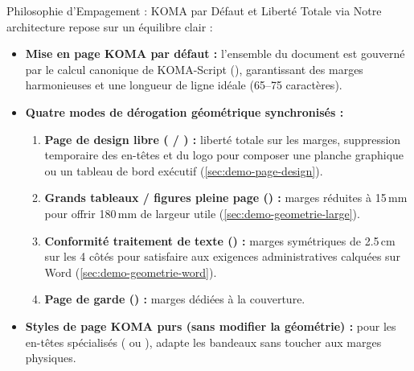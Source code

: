 \begin{boiteSynthese}{Philosophie d'Empagement : KOMA par Défaut et Liberté Totale via }
Notre architecture repose sur un équilibre clair :
\begin{itemize}
  \item \textbf{Mise en page KOMA par défaut :}
  l'ensemble du document est gouverné par le calcul canonique de KOMA-Script (),
  garantissant des marges harmonieuses et une longueur de ligne idéale (65--75 caractères).
  \item \textbf{Quatre modes de dérogation géométrique synchronisés :}
  \begin{enumerate}
    \item \textbf{Page de design libre ( / ) :} liberté totale sur les marges, suppression temporaire des en-têtes et du logo pour composer une planche graphique ou un tableau de bord exécutif (\cref{sec:demo-page-design}).
    \item \textbf{Grands tableaux / figures pleine page () :} marges réduites à 15\,mm
    pour offrir 180\,mm de largeur utile (\cref{sec:demo-geometrie-large}).
    \item \textbf{Conformité traitement de texte () :} marges symétriques de 2.5\,cm sur les 4 côtés
    pour satisfaire aux exigences administratives calquées sur Word (\cref{sec:demo-geometrie-word}).
    \item \textbf{Page de garde () :} marges dédiées à la couverture.
  \end{enumerate}
  \item \textbf{Styles de page KOMA purs (sans modifier la géométrie) :}
  pour les en-têtes spécialisés (
  ou ),
   adapte les bandeaux sans toucher aux marges physiques.
\end{itemize}
\end{boiteSynthese}

